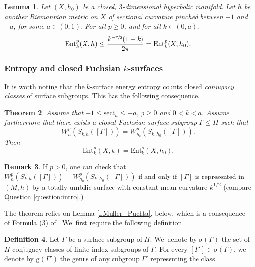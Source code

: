 \documentclass[JEP,XML,SOM,Unicode,NoEqCountersInSection,published]{cedram}
\newcommand{\ksurface}{$k$\nobreakdash-surface\xspace}
\newcommand{\ksurfaces}{$k$\nobreakdash-surfaces\xspace}
\theoremstyle{plain}
\newtheorem{theorem}{Theorem}[section]
\newtheorem{lemma}[theorem]{Lemma}
\theoremstyle{definition}
\newtheorem{defi}[theorem]{Definition}
\newtheorem{remark}[theorem]{Remark}
\newcommand{\sect}{\mathrm{sect}}
\newcommand{\Ent}{\mathrm{Ent}}
\begin{document}
\begin{lemma}\label{l_inequality_entropy}
Let $(X,h_0)$ be a closed, $3$\nobreakdash-dimensional hyperbolic manifold. Let $h$ be another Riemannian metric on $X$ of sectional curvature pinched between $-1$ and $-a$, for some $a\in(0,1)$. For all $p\geq 0$, and for all $k\in(0,a)$,
\begin{equation*}
\Ent^{p}_{k}(X,h)\leq\frac{k^{-\sfrac{p}{2}}(1-k)}{2\pi}=\Ent^{p}_{k}(X,h_0).
\end{equation*}
\end{lemma}

\subsubsection{Entropy and closed Fuchsian \protect\ksurfaces} It is worth noting that the \ksurface energy entropy counts closed \emph{conjugacy classes} of surface subgroups. This has the following consequence.

\begin{theorem}\label{th.totally_umb_implies_big_entropy}
Assume that $-1\leq\sect_h\leq-a$, $p\geq 0$ and $0<k<a$. Assume furthermore that there exists a closed \emph{Fuchsian} surface subgroup $\Gamma\leq\Pi$ such that
\begin{equation*}
W^{p}_{h}(S_{k,h}([\Gamma]))=W^{p}_{h_0}(S_{k,h_0}([\Gamma])).
\end{equation*}
Then
\begin{equation*}
\Ent^{p}_{k}(X,h)=\Ent^{p}_{k}(X,h_0).
\end{equation*}
\end{theorem}

\begin{remark}
If $p>0$, one can check that $W^{p}_{h}(S_{k,h}([\Gamma]))=W^{p}_{h_0}(S_{k,h_0}([\Gamma]))$ if and only if $[\Gamma]$ is represented in $(M,h)$ by a totally umbilic surface with constant mean curvature $k^{1/2}$ (compare Question \ref{question:intro}.)
\end{remark}

The theorem relies on Lemma \ref{l.Muller_Puchta}, below, which is a consequence of Formula (3) of \cite{Muller_Puchta}. We~first require the following definition.

\begin{defi}\label{d.conj_classes}
Let $\Gamma$ be a surface subgroup of $\Pi$. We~denote by $\sigma(\Gamma)$ the set of $\Pi$-conjugacy classes of finite-index subgroups of $\Gamma$. For every $[\Gamma']\in\sigma(\Gamma)$, we denote by $\mathrm{g}(\Gamma')$ the genus of any subgroup $\Gamma'$ representing the class.
\end{defi}
\end{document}
